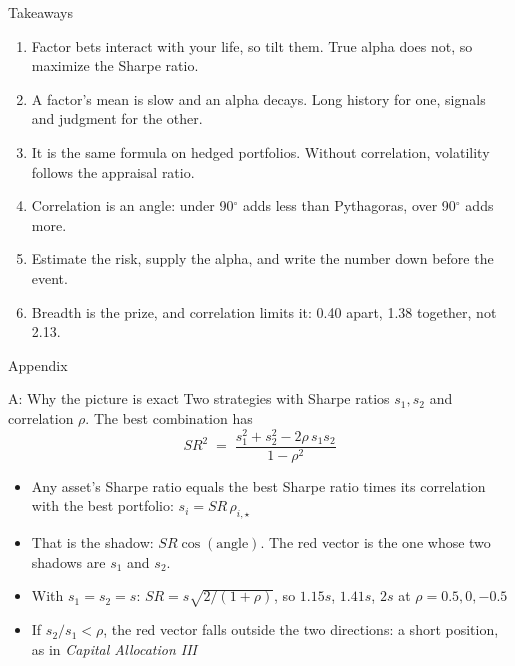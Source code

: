 \documentclass[aspectratio=169,10pt]{beamer}
\begin{document}
\begin{frame}{Takeaways}
\begin{enumerate}
\item Factor bets interact with your life, so tilt them. True alpha does not, so maximize the Sharpe ratio.
\vskip 5pt
\item A factor's mean is slow and an alpha decays. Long history for one, signals and judgment for the other.
\vskip 5pt
\item It is the same formula on hedged portfolios. Without correlation, volatility follows the appraisal ratio.
\vskip 5pt
\item Correlation is an angle: under 90$^\circ$ adds less than Pythagoras, over 90$^\circ$ adds more.
\vskip 5pt
\item Estimate the risk, supply the alpha, and write the number down before the event.
\vskip 5pt
\item Breadth is the prize, and correlation limits it: 0.40 apart, 1.38 together, not 2.13.
\end{enumerate}
\end{frame}

\appendix
\begin{frame}
\begin{center}
{\Large Appendix}
\end{center}
\end{frame}

\begin{frame}[label=appendix_angle]{A: Why the picture is exact}
Two strategies with Sharpe ratios $s_{1},s_{2}$ and correlation $\rho$. The best combination has
\[ SR^{2} \;=\; \frac{s_{1}^{2} + s_{2}^{2} - 2\rho\, s_{1}s_{2}}{1-\rho^{2}} \]
\vskip 4pt
\begin{itemize}
\item Any asset's Sharpe ratio equals the best Sharpe ratio times its correlation with the best portfolio: $s_{i} = SR\,\rho_{i,\star}$
\vskip 6pt
\item That is the shadow: $SR\cos(\text{angle})$. The red vector is the one whose two shadows are $s_{1}$ and $s_{2}$.
\vskip 6pt
\item With $s_{1}=s_{2}=s$: $SR = s\sqrt{2/(1+\rho)}$, so $1.15s$, $1.41s$, $2s$ at $\rho = 0.5, 0, -0.5$
\vskip 6pt
\item If $s_{2}/s_{1} < \rho$, the red vector falls outside the two directions: a short position, as in \emph{Capital Allocation III}
\end{itemize}
\hfill \hyperlink{back_angle}{}
\end{frame}
\end{document}
